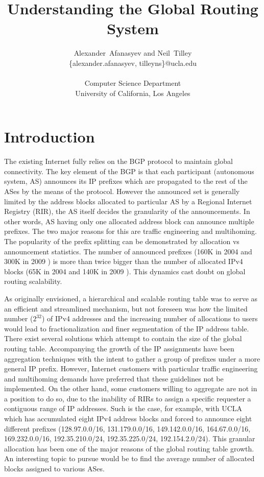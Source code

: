 \documentclass[conference]{IEEEtran}
\title{Understanding the Global Routing System}
\author{Alexander~Afanasyev %
and Neil~Tilley \\ %
\small \{alexander.afanasyev, tilleyns\}@ucla.edu \\ \\
\small Computer Science Department \\
\small University of California, Los Angeles \\
}
\begin{document}
\maketitle

\section{Introduction}

The existing Internet fully relies on the BGP protocol \cite{Rekhter:1995:RFC1771-BGP} to maintain global connectivity. The key element of the BGP is that each participant (autonomous system, AS) announces its IP prefixes which are propagated to the rest of the ASes by the means of the protocol. However the announced set is generally limited by the address blocks allocated to particular AS by a Regional Internet Registry (RIR), the AS itself decides the granularity of the announcements. In other words, AS having only one allocated address block can announce multiple prefixes. The two major reasons for this are traffic engineering and multihoming. The popularity of the prefix splitting can be demonstrated by allocation vs announcement statistics. The number of announced prefixes (160K in 2004 \cite{Meng:2005:IPv4-address} and 300K in 2009 \cite{::BGP-Reports}) is more than twice bigger than the number of allocated IPv4 blocks (65K in 2004  and 140K in 2009 ). This dynamics cast doubt on global routing scalability.

As originally envisioned, a hierarchical and scalable routing table was to serve as an efficient and streamlined mechanism, but not foreseen was how the limited number ($2^{32}$) of IPv4 addresses and the increasing number of allocations to users would lead to fractionalization and finer segmentation of the IP address table. There exist several solutions which attempt to contain the size of the global routing table.  Accompanying the growth of the IP assignments have been aggregation techniques with the intent to gather a group of prefixes under a more general IP prefix. However, Internet customers with particular traffic engineering and multihoming demands have preferred that these guidelines not be implemented. On the other hand, some customers willing to aggregate are not in a position to do so, due to the inability of RIRs to assign a specific requester a contiguous range of IP addresses. Such is the case, for example, with UCLA which has accumulated eight IPv4 address blocks and forced to announce eight different prefixes (128.97.0.0/16, 131.179.0.0/16, 149.142.0.0/16, 164.67.0.0/16, 169.232.0.0/16, 192.35.210.0/24, 192.35.225.0/24, 192.154.2.0/24). This granular allocation has been one of the major reasons of the global routing table growth. An interesting topic to pursue would be to find the average number of allocated blocks assigned to various ASes.
\end{document}
